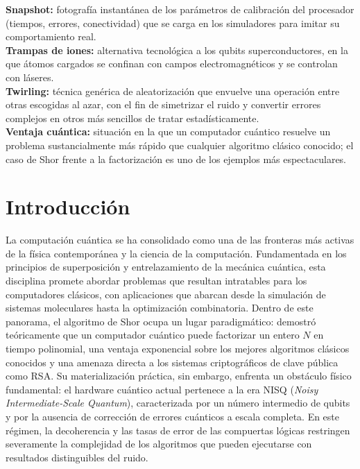 \documentclass[12pt, spanish]{book}
\begin{document}
\textbf{Snapshot:} fotografía instantánea de los parámetros de calibración del procesador (tiempos, errores, conectividad) que se carga en los simuladores para imitar su comportamiento real.\\

\textbf{Trampas de iones:} alternativa tecnológica a los qubits superconductores, en la que átomos cargados se confinan con campos electromagnéticos y se controlan con láseres.\\

\textbf{Twirling:} técnica genérica de aleatorización que envuelve una operación entre otras escogidas al azar, con el fin de simetrizar el ruido y convertir errores complejos en otros más sencillos de tratar estadísticamente.\\

\textbf{Ventaja cuántica:} situación en la que un computador cuántico resuelve un problema sustancialmente más rápido que cualquier algoritmo clásico conocido; el caso de Shor frente a la factorización es uno de los ejemplos más espectaculares.

\chapter{Introducción}
\label{chap:introduccion}

La computación cuántica se ha consolidado como una de las fronteras más activas de la física contemporánea y la ciencia de la computación. Fundamentada en los principios de superposición y entrelazamiento de la mecánica cuántica, esta disciplina promete abordar problemas que resultan intratables para los computadores clásicos, con aplicaciones que abarcan desde la simulación de sistemas moleculares hasta la optimización combinatoria. Dentro de este panorama, el algoritmo de Shor ocupa un lugar paradigmático: demostró teóricamente que un computador cuántico puede factorizar un entero \(N\) en tiempo polinomial, una ventaja exponencial sobre los mejores algoritmos clásicos conocidos y una amenaza directa a los sistemas criptográficos de clave pública como RSA. Su materialización práctica, sin embargo, enfrenta un obstáculo físico fundamental: el hardware cuántico actual pertenece a la era NISQ (\textit{Noisy Intermediate-Scale Quantum}), caracterizada por un número intermedio de qubits y por la ausencia de corrección de errores cuánticos a escala completa. En este régimen, la decoherencia y las tasas de error de las compuertas lógicas restringen severamente la complejidad de los algoritmos que pueden ejecutarse con resultados distinguibles del ruido.\\
\end{document}
